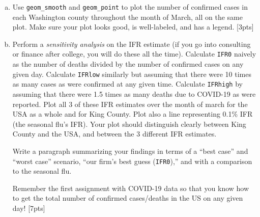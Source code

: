 \documentclass[12pt]{article}
\begin{document}
\begin{enumerate}[(a)]
	\item Use \verb|geom_smooth| and \verb|geom_point| to plot the number of confirmed cases in each Washington county throughout the month of March, all on the same plot. Make sure your plot looks good, is well-labeled, and has a legend. [3pts]
	\item Perform a \textit{sensitivity analysis} on the IFR estimate (if you go into consulting or finance after college, you will do these all the time). Calculate \verb|IFR0| naively as the number of deaths divided by the number of confirmed cases on any given day. Calculate \verb|IFRlow| similarly but assuming that there were 10 times as many cases as were confirmed at any given time. Calculate \verb|IFRhigh| by assuming that there were 1.5 times as many deaths due to COVID-19 as were reported. Plot all 3 of these IFR estimates over the month of march for the USA as a whole and for King County. Plot also a line representing 0.1\% IFR (the seasonal flu's IFR). Your plot should distinguish clearly between King County and the USA, and between the 3 different IFR estimates.
	
	Write a paragraph summarizing your findings in terms of a ``best case'' and ``worst case'' scenario, ``our firm's best guess (\verb|IFR0|),'' and with a comparison to the seasonal flu.
	
	Remember the first assignment with COVID-19 data so that you know how to get the total number of confirmed cases/deaths in the US on any given day! [7pts]
\end{enumerate}
\end{document}
